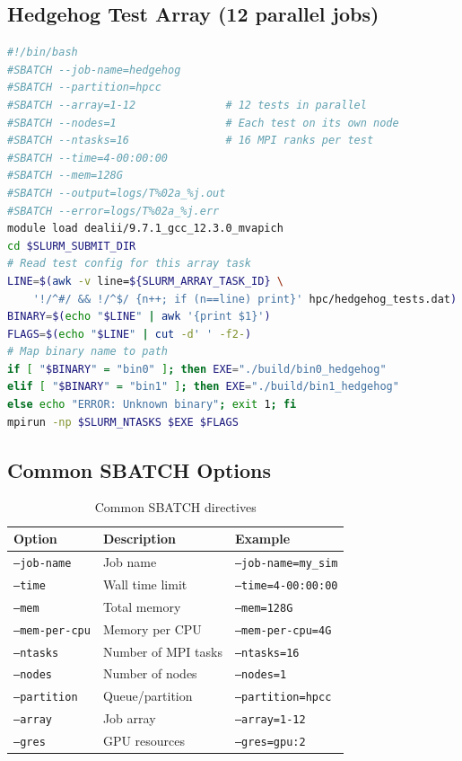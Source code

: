 \documentclass[11pt,a4paper]{article}
\begin{document}
\subsection{Hedgehog Test Array (12 parallel jobs)}
\begin{lstlisting}[language=bash]
#!/bin/bash
#SBATCH --job-name=hedgehog
#SBATCH --partition=hpcc
#SBATCH --array=1-12              # 12 tests in parallel
#SBATCH --nodes=1                 # Each test on its own node
#SBATCH --ntasks=16               # 16 MPI ranks per test
#SBATCH --time=4-00:00:00
#SBATCH --mem=128G
#SBATCH --output=logs/T%02a_%j.out
#SBATCH --error=logs/T%02a_%j.err
module load dealii/9.7.1_gcc_12.3.0_mvapich
cd $SLURM_SUBMIT_DIR
# Read test config for this array task
LINE=$(awk -v line=${SLURM_ARRAY_TASK_ID} \
    '!/^#/ && !/^$/ {n++; if (n==line) print}' hpc/hedgehog_tests.dat)
BINARY=$(echo "$LINE" | awk '{print $1}')
FLAGS=$(echo "$LINE" | cut -d' ' -f2-)
# Map binary name to path
if [ "$BINARY" = "bin0" ]; then EXE="./build/bin0_hedgehog"
elif [ "$BINARY" = "bin1" ]; then EXE="./build/bin1_hedgehog"
else echo "ERROR: Unknown binary"; exit 1; fi
mpirun -np $SLURM_NTASKS $EXE $FLAGS
\end{lstlisting}
\subsection{Common SBATCH Options}
\begin{table}[h]
\centering
\begin{tabular}{@{}lll@{}}
\toprule
\textbf{Option} & \textbf{Description} & \textbf{Example} \\
\midrule
\texttt{--job-name} & Job name & \texttt{--job-name=my\_sim} \\
\texttt{--time} & Wall time limit & \texttt{--time=4-00:00:00} \\
\texttt{--mem} & Total memory & \texttt{--mem=128G} \\
\texttt{--mem-per-cpu} & Memory per CPU & \texttt{--mem-per-cpu=4G} \\
\texttt{--ntasks} & Number of MPI tasks & \texttt{--ntasks=16} \\
\texttt{--nodes} & Number of nodes & \texttt{--nodes=1} \\
\texttt{--partition} & Queue/partition & \texttt{--partition=hpcc} \\
\texttt{--array} & Job array & \texttt{--array=1-12} \\
\texttt{--gres} & GPU resources & \texttt{--gres=gpu:2} \\
\bottomrule
\end{tabular}
\caption{Common SBATCH directives}
\end{table}
\end{document}
